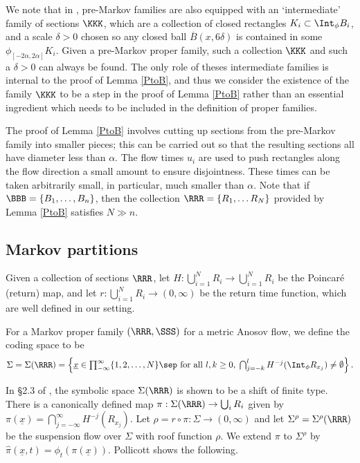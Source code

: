 We note that in \cite{bowen-symbolic, pollicott}, pre-Markov families are also equipped with an `intermediate' family of sections $\KKK$, which are a collection of closed rectangles $K_i \subset \Int_\phi B_i$, and a scale $\delta>0$ chosen so any closed ball $\overline B(x, 6\delta)$ is contained in some $\phi_{[-2 \alpha, 2 \alpha]}K_i$. Given a pre-Markov proper family, such a collection $\KKK$ and such a $\delta>0$ can always be found. The only role of theses intermediate families is internal to the proof of Lemma \ref{PtoB}, and thus we consider the existence of the family $\KKK$ to be a step in the proof of Lemma \ref{PtoB} rather than an essential ingredient which needs to be included in the definition of proper families.

The proof of Lemma \ref{PtoB} involves cutting up sections from the pre-Markov family into smaller pieces; this can be carried out so that the resulting sections all have diameter less than $\alpha$. The flow times $u_i$ are used to push rectangles along the flow direction a small amount to ensure disjointness. These times can be taken arbitrarily small, in particular, much smaller than $\alpha$. Note that if $\BBB = \{B_1, \ldots, B_n\}$, then the collection $\RRR= \{R_1, \ldots R_N\}$ provided by Lemma \ref{PtoB} satisfies $N \gg  n$.

\subsection{Markov partitions}

Given a collection of sections $\RRR$, let $H: \bigcup_{i=1}^N R_i \to \bigcup_{i=1}^N R_i$ be the Poincaré (return) map, and let $r: \bigcup_{i=1}^N R_i \to (0, \infty)$ be the return time function, which are well defined in our setting.

\begin{defn}
For a Markov proper family $(\RRR, \SSS)$ for a metric Anosov flow, we define the coding space to be
\[\textstyle \Sigma=\Sigma(\RRR)= \left \{ \underline x \in \prod_{-\infty}^{\infty}\{1, 2, \ldots, N\} \sep \text{ for all } l, k \geq 0,\; \bigcap_{j=-k}^l H^{-j}( \Int_\phi R_{x_j}) \neq \emptyset \right \}. \]
\end{defn}

In \S2.3 of \cite{pollicott}, the symbolic space $\Sigma(\RRR)$ is shown to be a shift of finite type. There is a canonically defined map $\pi: \Sigma(\RRR) \to \bigcup_i R_i$ given by $\pi(\underline x) = \bigcap_{j=-\infty}^\infty H^{-j}(R_{x_j})$. Let $\rho= r \circ \pi: \Sigma \to (0, \infty)$ and let $\Sigma^\rho=\Sigma^\rho(\RRR)$ be the suspension flow over $\Sigma$ with roof function $\rho$. We extend $\pi$ to $\Sigma^\rho$ by $\hat \pi(\underline x, t) = \phi_t(\pi(\underline x))$. Pollicott shows the following.

